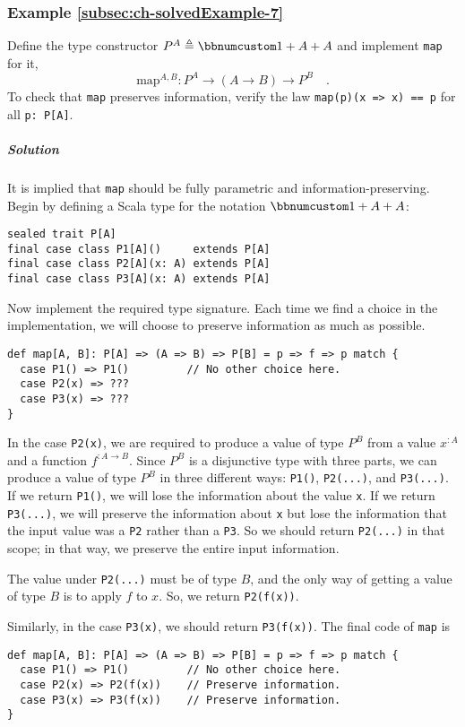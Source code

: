 \subsubsection{Example \label{subsec:ch-solvedExample-7}\ref{subsec:ch-solvedExample-7}}

Define the type constructor $P^{A}\triangleq\bbnum 1+A+A$ and implement
\lstinline!map! for it,
\[
\text{map}^{A,B}:P^{A}\rightarrow(A\rightarrow B)\rightarrow P^{B}\quad.
\]
To check that \lstinline!map! preserves information, verify the law
\lstinline!map(p)(x => x) == p! for all \lstinline!p: P[A]!.

\subparagraph{Solution}

It is implied that \lstinline!map! should be fully parametric and
information-preserving. Begin by defining a Scala type for the notation
$\bbnum 1+A+A$:
\begin{lstlisting}
sealed trait P[A]
final case class P1[A]()     extends P[A]
final case class P2[A](x: A) extends P[A]
final case class P3[A](x: A) extends P[A]
\end{lstlisting}
Now implement the required type signature. Each time we find a choice
in the implementation, we will choose to preserve information as much
as possible.
\begin{lstlisting}
def map[A, B]: P[A] => (A => B) => P[B] = p => f => p match {
  case P1() => P1()         // No other choice here.
  case P2(x) => ???
  case P3(x) => ???
}
\end{lstlisting}
In the case \lstinline!P2(x)!, we are required to produce a value
of type $P^{B}$ from a value $x^{:A}$ and a function $f^{:A\rightarrow B}$.
Since $P^{B}$ is a disjunctive type with three parts, we can produce
a value of type $P^{B}$ in three different ways: \lstinline!P1()!,
\lstinline!P2(...)!, and \lstinline!P3(...)!. If we return \lstinline!P1()!,
we will lose the information about the value \lstinline!x!. If we
return \lstinline!P3(...)!, we will preserve the information about
\lstinline!x! but lose the information that
the input value was a \lstinline!P2! rather than a \lstinline!P3!.
So we should return \lstinline!P2(...)! in that scope; in that way,
we preserve the entire input information. 

The value under \lstinline!P2(...)! must be of type $B$, and the
only way of getting a value of type $B$ is to apply $f$ to $x$.
So, we return \lstinline!P2(f(x))!.

Similarly, in the case \lstinline!P3(x)!, we should return \lstinline!P3(f(x))!.
The final code of \lstinline!map! is
\begin{lstlisting}
def map[A, B]: P[A] => (A => B) => P[B] = p => f => p match {
  case P1() => P1()         // No other choice here.
  case P2(x) => P2(f(x))    // Preserve information.
  case P3(x) => P3(f(x))    // Preserve information.
}
\end{lstlisting}


